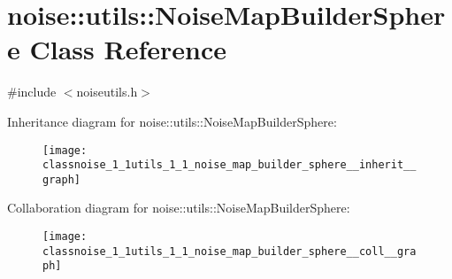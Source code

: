 \hypertarget{classnoise_1_1utils_1_1_noise_map_builder_sphere}{\section{noise\+:\+:utils\+:\+:Noise\+Map\+Builder\+Sphere Class Reference}
\label{classnoise_1_1utils_1_1_noise_map_builder_sphere}
}


{\ttfamily \#include $<$noiseutils.\+h$>$}



Inheritance diagram for noise\+:\+:utils\+:\+:Noise\+Map\+Builder\+Sphere\+:\nopagebreak
\begin{figure}[H]
\begin{center}
\leavevmode
\texttt{[image: classnoise\_1\_1utils\_1\_1\_noise\_map\_builder\_sphere\_\_inherit\_\_graph]}
\end{center}
\end{figure}


Collaboration diagram for noise\+:\+:utils\+:\+:Noise\+Map\+Builder\+Sphere\+:\nopagebreak
\begin{figure}[H]
\begin{center}
\leavevmode
\texttt{[image: classnoise\_1\_1utils\_1\_1\_noise\_map\_builder\_sphere\_\_coll\_\_graph]}
\end{center}
\end{figure}

